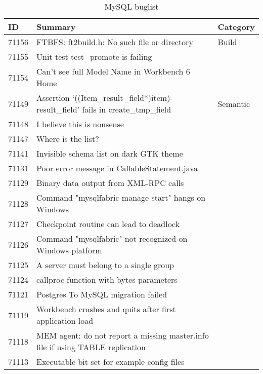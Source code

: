 \begin{longtable}[c]{p{1cm}p{10cm}p{1cm}}
\caption{MySQL buglist}
\label{tab:mysqlbuglist}\\
ID & Summary & Category \\
\endfirsthead
%
\endhead
%
71156 & FTBFS: ft2build.h: No such file or directory & Build \\
71155 & Unit test test\_promote is failing &  \\
71154 & Can't see full Model Name in Workbench 6 Home &  \\
71149 & Assertion `((Item\_result\_field*)item)-result\_field' fails in create\_tmp\_field & Semantic \\
71148 & I believe this is nonsense &  \\
71147 & Where is the list? &  \\
71141 & Invisible schema list on dark GTK theme &  \\
71131 & Poor error message in CallableStatement.java &  \\
71129 & Binary data output from XML-RPC calls &  \\
71128 & Command "mysqlfabric manage start" hangs on Windows &  \\
71127 & Checkpoint routine can lead to deadlock &  \\
71126 & Command "mysqlfabric" not recognized on Windows platform &  \\
71125 & A server must belong to a single group &  \\
71124 & callproc function with bytes parameters &  \\
71121 & Postgres To MySQL migration failed &  \\
71119 & Workbench crashes and quits after first application load &  \\
71118 & MEM agent: do not report a missing master.info file if using TABLE replication &  \\
71113 & Executable bit set for example config files &  \\

\end{longtable}
